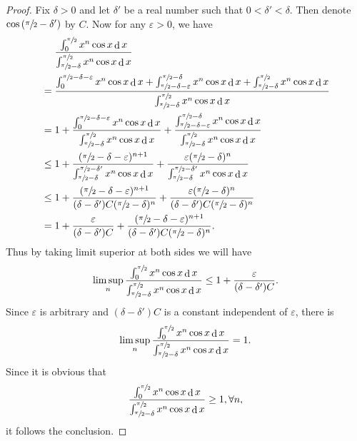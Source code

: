 \documentclass[a4paper, 12pt]{ctexart}
\theoremstyle{plain}
\theoremstyle{plain}
\theoremstyle{plain}
\theoremstyle{nonumberplain}
\newtheorem{proof}{Proof}
\DeclareMathOperator*{\diff}{d}
\newcommand{\intcos}[2]{\int_{#1}^{#2}{x^{n}\cos{x}\diff x}}
\begin{document}
    \begin{proof}
        Fix $\delta>0$ and let $\delta'$ be a real number such that
        $0<\delta'<\delta$. Then denote $\cos{(\sfrac{\pi}{2}-\delta')}$ by $C$.
        Now for any $\varepsilon>0$, we have
        \begin{equation}
        \begin{aligned}
            &\phantom{{}={}}
              \frac{\intcos{0}{\sfrac{\pi}{2}}}{\intcos{\sfrac{\pi}{2}-\delta}{\sfrac{\pi}{2}}}\\
            &= \frac{\intcos{0}{\sfrac{\pi}{2}-\delta-\varepsilon}
              + \intcos{\sfrac{\pi}{2}-\delta-\varepsilon}{\sfrac{\pi}{2}-\delta}
              + \intcos{\sfrac{\pi}{2}-\delta}{\sfrac{\pi}{2}}}{\intcos{\sfrac{\pi}{2}-\delta}{\sfrac{\pi}{2}}}\\
            &= 1
              + \frac{\intcos{0}{\sfrac{\pi}{2}-\delta-\varepsilon}}
                {\intcos{\sfrac{\pi}{2}-\delta}{\sfrac{\pi}{2}}}
              + \frac{\intcos{\sfrac{\pi}{2}-\delta-\varepsilon}{\sfrac{\pi}{2}-\delta}}
                {\intcos{\sfrac{\pi}{2}-\delta}{\sfrac{\pi}{2}}}\\
            &\leq 1
              + \frac{(\sfrac{\pi}{2}-\delta-\varepsilon)^{n+1}}
                {\intcos{\sfrac{\pi}{2}-\delta}{\sfrac{\pi}{2}-\delta'}}
              + \frac{\varepsilon(\sfrac{\pi}{2}-\delta)^{n}}
                {\intcos{\sfrac{\pi}{2}-\delta}{\sfrac{\pi}{2}-\delta'}}\\
            &\leq 1
              + \frac{(\sfrac{\pi}{2}-\delta-\varepsilon)^{n+1}}
                {(\delta-\delta')C(\sfrac{\pi}{2}-\delta)^{n}}
              + \frac{\varepsilon(\sfrac{\pi}{2}-\delta)^{n}}
                {(\delta-\delta')C(\sfrac{\pi}{2}-\delta)^{n}}\\
            &= 1 + \frac{\varepsilon}{(\delta-\delta')C}
              + \frac{(\sfrac{\pi}{2}-\delta-\varepsilon)^{n+1}}
                {(\delta-\delta')C(\sfrac{\pi}{2}-\delta)^{n}}.
        \end{aligned}
        \end{equation}
        Thus by taking limit superior at both sides we will have
        \begin{equation}
            \limsup_{n}
            {\frac{\intcos{0}{\sfrac{\pi}{2}}}{\intcos{\sfrac{\pi}{2}-\delta}{\sfrac{\pi}{2}}}}
            \leq
            1 + \frac{\varepsilon}{(\delta-\delta')C}.
        \end{equation}
        Since $\varepsilon$ is arbitrary and $(\delta-\delta')C$ is
        a constant independent of $\varepsilon$, there is
        \begin{equation}
            \limsup_{n}
            {\frac{\intcos{0}{\sfrac{\pi}{2}}}{\intcos{\sfrac{\pi}{2}-\delta}{\sfrac{\pi}{2}}}} = 1.
        \end{equation}
        Since it is obvious that
        \begin{equation}
            \frac{\intcos{0}{\sfrac{\pi}{2}}}{\intcos{\sfrac{\pi}{2}-\delta}{\sfrac{\pi}{2}}} \geq 1,
            \forall n,
        \end{equation}
        it follows the conclusion.
    \end{proof}
\end{document}
